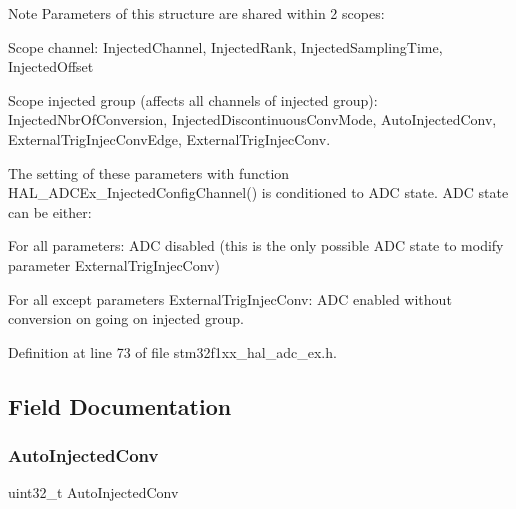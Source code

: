 \begin{DoxyNote}{Note}
Parameters of this structure are shared within 2 scopes\+:
\begin{DoxyItemize}
\item Scope channel\+: Injected\+Channel, Injected\+Rank, Injected\+Sampling\+Time, Injected\+Offset
\item Scope injected group (affects all channels of injected group)\+: Injected\+Nbr\+Of\+Conversion, Injected\+Discontinuous\+Conv\+Mode, Auto\+Injected\+Conv, External\+Trig\+Injec\+Conv\+Edge, External\+Trig\+Injec\+Conv. 
\end{DoxyItemize}

The setting of these parameters with function H\+A\+L\+\_\+\+A\+D\+C\+Ex\+\_\+\+Injected\+Config\+Channel() is conditioned to A\+DC state. A\+DC state can be either\+:
\begin{DoxyItemize}
\item For all parameters\+: A\+DC disabled (this is the only possible A\+DC state to modify parameter \textquotesingle{}External\+Trig\+Injec\+Conv\textquotesingle{})
\item For all except parameters \textquotesingle{}External\+Trig\+Injec\+Conv\textquotesingle{}\+: A\+DC enabled without conversion on going on injected group. 
\end{DoxyItemize}
\end{DoxyNote}


Definition at line 73 of file stm32f1xx\+\_\+hal\+\_\+adc\+\_\+ex.\+h.



\subsection{Field Documentation}
\mbox{\label{struct_a_d_c___injection_conf_type_def_ad8d4635c3c52f7763b8d7dfb2d0d4605}} 
\subsubsection{\texorpdfstring{Auto\+Injected\+Conv}{AutoInjectedConv}}
{\footnotesize\ttfamily uint32\+\_\+t Auto\+Injected\+Conv}

